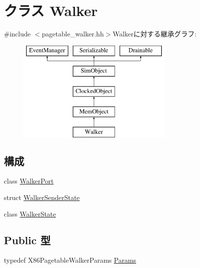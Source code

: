 \hypertarget{classX86ISA_1_1Walker}{
\section{クラス Walker}
\label{classX86ISA_1_1Walker}
}


{\ttfamily \#include $<$pagetable\_\-walker.hh$>$}Walkerに対する継承グラフ:\begin{figure}[H]
\begin{center}
\leavevmode
\includegraphics[height=5cm]{classX86ISA_1_1Walker}
\end{center}
\end{figure}
\subsection*{構成}
\begin{DoxyCompactItemize}
\item 
class \hyperlink{classX86ISA_1_1Walker_1_1WalkerPort}{WalkerPort}
\item 
struct \hyperlink{structX86ISA_1_1Walker_1_1WalkerSenderState}{WalkerSenderState}
\item 
class \hyperlink{classX86ISA_1_1Walker_1_1WalkerState}{WalkerState}
\end{DoxyCompactItemize}
\subsection*{Public 型}
\begin{DoxyCompactItemize}
\item 
typedef X86PagetableWalkerParams \hyperlink{classX86ISA_1_1Walker_a55ceaa41cdace6176b677cc22eb01bf6}{Params}
\end{DoxyCompactItemize}

